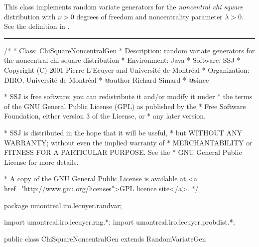 
This class implements random variate generators for the
{\em noncentral chi square\/} distribution with $\nu > 0$ degrees of freedom
and noncentrality parameter $\lambda > 0$. See the definition in
 .

\bigskip\hrule

\begin{code}
\begin{hide}
/*
 * Class:        ChiSquareNoncentralGen
 * Description:  random variate generators for the noncentral chi square distribution
 * Environment:  Java
 * Software:     SSJ 
 * Copyright (C) 2001  Pierre L'Ecuyer and Université de Montréal
 * Organization: DIRO, Université de Montréal
 * @author       Richard Simard
 * @since

 * SSJ is free software: you can redistribute it and/or modify it under
 * the terms of the GNU General Public License (GPL) as published by the
 * Free Software Foundation, either version 3 of the License, or
 * any later version.

 * SSJ is distributed in the hope that it will be useful,
 * but WITHOUT ANY WARRANTY; without even the implied warranty of
 * MERCHANTABILITY or FITNESS FOR A PARTICULAR PURPOSE.  See the
 * GNU General Public License for more details.

 * A copy of the GNU General Public License is available at
   <a href="http://www.gnu.org/licenses">GPL licence site</a>.
 */
\end{hide}
package umontreal.iro.lecuyer.randvar;\begin{hide}
import umontreal.iro.lecuyer.rng.*;
import umontreal.iro.lecuyer.probdist.*;
\end{hide}

public class ChiSquareNoncentralGen extends RandomVariateGen \begin{hide} {
   protected double nu = -1.0;
   protected double lambda = -1.0;

\end{hide}
\end{code}

